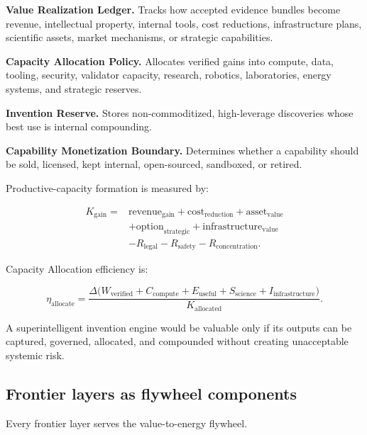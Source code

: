\textbf{Value Realization Ledger.} Tracks how accepted evidence bundles
become revenue, intellectual property, internal tools, cost reductions,
infrastructure plans, scientific assets, market mechanisms, or strategic
capabilities.

\textbf{Capacity Allocation Policy.} Allocates verified gains into
compute, data, tooling, security, validator capacity, research,
robotics, laboratories, energy systems, and strategic reserves.

\textbf{Invention Reserve.} Stores non-commoditized, high-leverage
discoveries whose best use is internal compounding.

\textbf{Capability Monetization Boundary.} Determines whether a
capability should be sold, licensed, kept internal, open-sourced,
sandboxed, or retired.

Productive-capacity formation is measured by:

\[
\begin{aligned}
K_{\mathrm{gain}}={}&
\mathrm{revenue}_{\mathrm{gain}}
+\mathrm{cost}_{\mathrm{reduction}}
+\mathrm{asset}_{\mathrm{value}} \\
&+\mathrm{option}_{\mathrm{strategic}}
+\mathrm{infrastructure}_{\mathrm{value}} \\
&-R_{\mathrm{legal}}-R_{\mathrm{safety}}-R_{\mathrm{concentration}}.
\end{aligned}
\]

Capacity Allocation efficiency is:

\[
\eta_{\mathrm{allocate}}
=
\frac{
\Delta\!\big(W_{\mathrm{verified}}+C_{\mathrm{compute}}+E_{\mathrm{useful}}
+S_{\mathrm{science}}+I_{\mathrm{infrastructure}}\big)
}{K_{\mathrm{allocated}}}.
\]

A superintelligent invention engine would be valuable only if its
outputs can be captured, governed, allocated, and compounded without
creating unacceptable systemic risk.

\subsection{Frontier layers as flywheel
components}\label{frontier-layers-as-flywheel-components}

Every frontier layer serves the value-to-energy flywheel.

